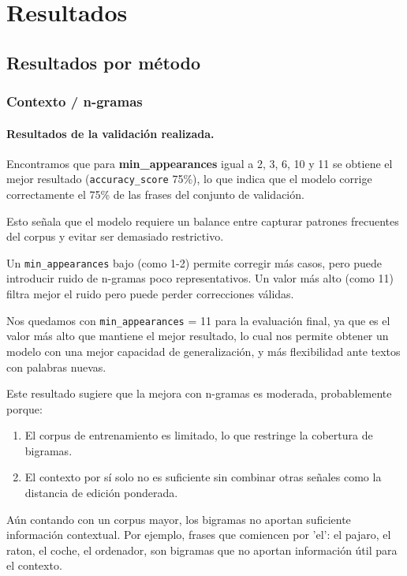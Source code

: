 \documentclass[12pt,a4paper]{article}
\begin{document}
\section{Resultados}

\subsection{Resultados por método}
\subsubsection{Contexto / n-gramas}

\paragraph{Resultados de la validación realizada.}
Encontramos que para \textbf{min\_appearances} igual a 2, 3, 6, 10 y 11 se obtiene el mejor resultado (\texttt{accuracy\_score} 75\%), lo que indica que el modelo corrige correctamente el 75\% de las frases del conjunto de validación.

Esto señala que el modelo requiere un balance entre capturar patrones frecuentes del corpus y evitar ser demasiado restrictivo. 

Un \texttt{min\_appearances} bajo (como 1-2) permite corregir más casos, pero puede introducir ruido de n-gramas poco representativos. Un valor más alto (como 11) filtra mejor el ruido pero puede perder correcciones válidas. 

Nos quedamos con \texttt{min\_appearances} = 11 para la evaluación final, ya que es el valor más alto que mantiene el mejor resultado, lo cual nos permite obtener un modelo con una mejor capacidad de generalización, y más flexibilidad ante textos con palabras nuevas.

Este resultado sugiere que la mejora con n-gramas es moderada, probablemente porque:
\begin{enumerate}
    \item El corpus de entrenamiento es limitado, lo que restringe la cobertura de bigramas.
    \item El contexto por sí solo no es suficiente sin combinar otras señales como la distancia de edición ponderada.
\end{enumerate} 

Aún contando con un corpus mayor, los bigramas no aportan suficiente información contextual. Por ejemplo, frases que comiencen por 'el': el pajaro, el raton, el coche, el ordenador, son bigramas que no aportan información útil para el contexto.
\end{document}
